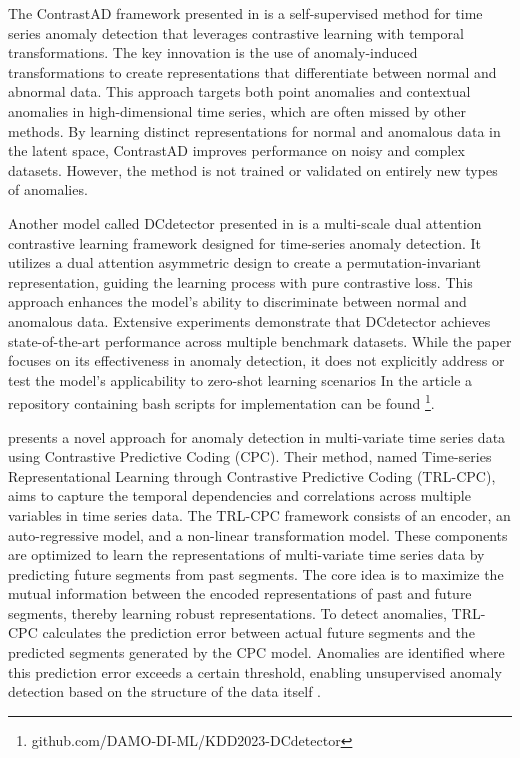 The ContrastAD framework presented in \cite{li_contrastive_2023} is a self-supervised method for time series anomaly detection that leverages contrastive learning with temporal transformations. The key innovation is the use of anomaly-induced transformations to create representations that differentiate between normal and abnormal data. This approach targets both point anomalies and contextual anomalies in high-dimensional time series, which are often missed by other methods. By learning distinct representations for normal and anomalous data in the latent space, ContrastAD improves performance on noisy and complex datasets. However, the method is not trained or validated on entirely new types of anomalies.

Another model called DCdetector presented in \cite{yang_dcdetector_2023} is a multi-scale dual attention contrastive learning framework designed for time-series anomaly detection. It utilizes a dual attention asymmetric design to create a permutation-invariant representation, guiding the learning process with pure contrastive loss. This approach enhances the model's ability to discriminate between normal and anomalous data. Extensive experiments demonstrate that DCdetector achieves state-of-the-art performance across multiple benchmark datasets. While the paper focuses on its effectiveness in anomaly detection, it does not explicitly address or test the model's applicability to zero-shot learning scenarios \cite{yang_dcdetector_2023} In the article a repository containing bash scripts for implementation can be found \footnote{\fussy\tiny github.com/DAMO-DI-ML/KDD2023-DCdetector}.

\cite{pranavan_contrastive_2022} presents a novel approach for anomaly detection in multi-variate time series data using Contrastive Predictive Coding (CPC). Their method, named Time-series Representational Learning through Contrastive Predictive Coding (TRL-CPC), aims to capture the temporal dependencies and correlations across multiple variables in time series data.
The TRL-CPC framework consists of an encoder, an auto-regressive model, and a non-linear transformation model. These components are optimized to learn the representations of multi-variate time series data by predicting future segments from past segments. The core idea is to maximize the mutual information between the encoded representations of past and future segments, thereby learning robust representations.
To detect anomalies, TRL-CPC calculates the prediction error between actual future segments and the predicted segments generated by the CPC model. Anomalies are identified where this prediction error exceeds a certain threshold, enabling unsupervised anomaly detection based on the structure of the data itself \cite{pranavan_contrastive_2022}.

